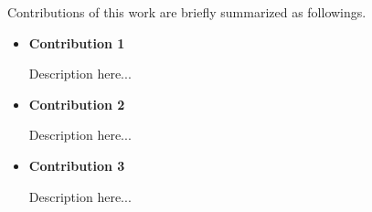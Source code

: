 Contributions of this work are briefly summarized as followings.

\begin{itemize}

\item {\bf Contribution 1}

Description here...

\item {\bf Contribution 2}

Description here...

\item {\bf Contribution 3}

Description here...

\end{itemize}